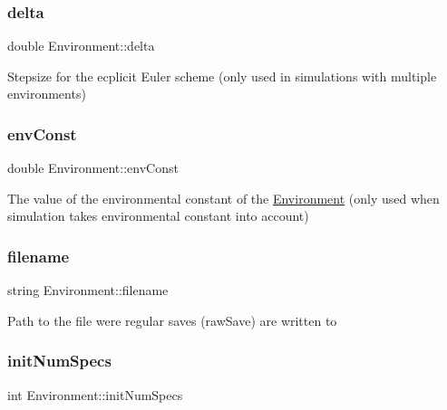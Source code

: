 \subsubsection{\texorpdfstring{delta}{delta}}
{\footnotesize\ttfamily double Environment\+::delta\hspace{0.3cm}{\ttfamily [protected]}}

Stepsize for the ecplicit Euler scheme (only used in simulations with multiple environments) \hypertarget{classEnvironment_a664313c95d2a9afc397ab4bf6f4f1457}{}\label{classEnvironment_a664313c95d2a9afc397ab4bf6f4f1457} 
\subsubsection{\texorpdfstring{env\+Const}{envConst}}
{\footnotesize\ttfamily double Environment\+::env\+Const\hspace{0.3cm}{\ttfamily [protected]}}

The value of the environmental constant of the \hyperlink{classEnvironment}{Environment} (only used when simulation takes environmental constant into account) \hypertarget{classEnvironment_afefeccf87332c116006372e3ee197452}{}\label{classEnvironment_afefeccf87332c116006372e3ee197452} 
\subsubsection{\texorpdfstring{filename}{filename}}
{\footnotesize\ttfamily string Environment\+::filename\hspace{0.3cm}{\ttfamily [protected]}}

Path to the file were regular saves (raw\+Save) are written to \hypertarget{classEnvironment_a5c1c5043ec7885eb05d88590f405c02b}{}\label{classEnvironment_a5c1c5043ec7885eb05d88590f405c02b} 
\subsubsection{\texorpdfstring{init\+Num\+Specs}{initNumSpecs}}
{\footnotesize\ttfamily int Environment\+::init\+Num\+Specs\hspace{0.3cm}{\ttfamily [protected]}}


